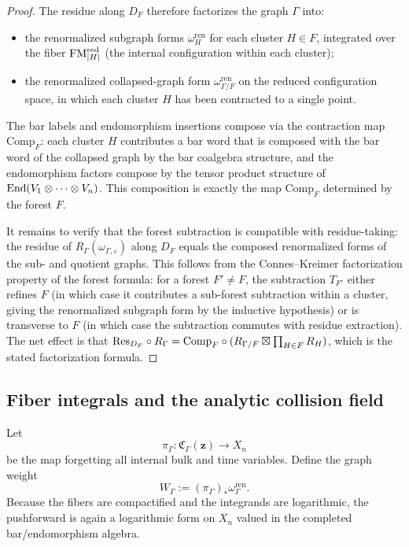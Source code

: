 \begin{proof}
The residue along $D_F$ therefore factorizes the graph $\Gamma$ into:
\begin{itemize}
 \item the renormalized subgraph forms $\omega_H^{\mathrm{ren}}$ for each cluster $H \in F$, integrated over the fiber $\mathrm{FM}_{|H|}^{\mathrm{red}}$ (the internal configuration within each cluster);
 \item the renormalized collapsed-graph form $\omega_{\Gamma/F}^{\mathrm{ren}}$ on the reduced configuration space, in which each cluster $H$ has been contracted to a single point.
\end{itemize}
The bar labels and endomorphism insertions compose via the contraction map $\mathrm{Comp}_F$: each cluster $H$ contributes a bar word that is composed with the bar word of the collapsed graph by the bar coalgebra structure, and the endomorphism factors compose by the tensor product structure of $\mathrm{End}(V_1 \otimes \cdots \otimes V_n)$. This composition is exactly the map $\mathrm{Comp}_F$ determined by the forest $F$.

It remains to verify that the forest subtraction is compatible with residue-taking: the residue of $R_\Gamma(\omega_{\Gamma,\varepsilon})$ along $D_F$ equals the composed renormalized forms of the sub- and quotient graphs. This follows from the Connes--Kreimer factorization property of the forest formula: for a forest $F' \neq F$, the subtraction $T_{F'}$ either refines $F$ (in which case it contributes a sub-forest subtraction within a cluster, giving the renormalized subgraph form by the inductive hypothesis) or is transverse to $F$ (in which case the subtraction commutes with residue extraction). The net effect is that $\mathrm{Res}_{D_F} \circ R_\Gamma = \mathrm{Comp}_F \circ (R_{\Gamma/F} \boxtimes \prod_{H \in F} R_H)$, which is the stated factorization formula.
\end{proof}

\subsection{Fiber integrals and the analytic collision field}
Let
\[
 \pi_\Gamma : \mathfrak C_\Gamma(\mathbf z) \longrightarrow X_n
\]
be the map forgetting all internal bulk and time variables. Define the graph weight
\[
 W_\Gamma := (\pi_\Gamma)_*\omega_\Gamma^{\mathrm{ren}}.
\]
Because the fibers are compactified and the integrands are logarithmic, the pushforward is again a logarithmic form on $X_n$ valued in the completed bar/endomorphism algebra.


